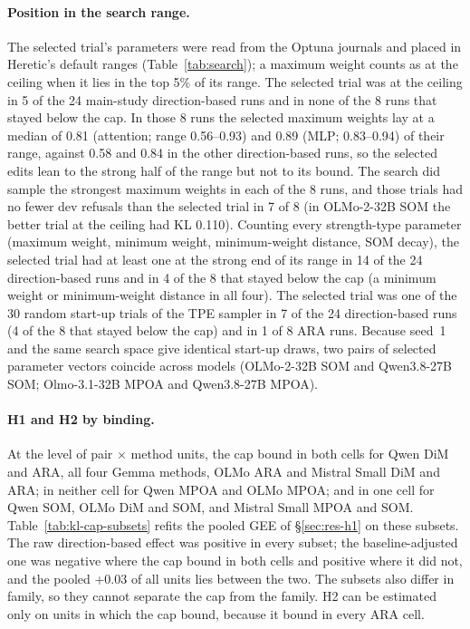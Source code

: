 \paragraph{Position in the search range.} The selected trial's parameters were
read from the Optuna journals and placed in Heretic's default ranges
(Table~\ref{tab:search}); a maximum weight counts as at the ceiling when it
lies in the top 5\% of its range. The selected trial was at the ceiling in 5
of the 24 main-study direction-based runs and in none of the 8 runs that
stayed below the cap. In those 8 runs the selected maximum weights lay at a
median of 0.81 (attention; range 0.56--0.93) and 0.89 (MLP; 0.83--0.94) of
their range, against 0.58 and 0.84 in the other direction-based runs, so the
selected edits lean to the strong half of the range but not to its bound. The
search did sample the strongest maximum weights in each of the 8 runs, and
those trials had no fewer dev refusals than the selected trial in 7 of 8 (in
OLMo-2-32B SOM the better trial at the ceiling had KL 0.110). Counting every
strength-type parameter (maximum weight, minimum weight, minimum-weight
distance, SOM decay), the selected trial had at least one at the strong end of
its range in 14 of the 24 direction-based runs and in 4 of the 8 that stayed
below the cap (a minimum weight or minimum-weight distance in all four). The selected
trial was one of the 30 random start-up trials of the TPE sampler in 7 of the
24 direction-based runs (4 of the 8 that stayed below the cap) and in 1 of 8
ARA runs. Because seed~1 and the same search space give identical start-up
draws, two pairs of selected parameter vectors coincide across models
(OLMo-2-32B SOM and Qwen3.8-27B SOM; Olmo-3.1-32B MPOA and Qwen3.8-27B MPOA).

\paragraph{H1 and H2 by binding.} At the level of pair $\times$ method units,
the cap bound in both cells for Qwen DiM and ARA, all four Gemma methods, OLMo
ARA and Mistral Small DiM and ARA; in neither cell for Qwen MPOA and OLMo
MPOA; and in one cell for Qwen SOM, OLMo DiM and SOM, and Mistral Small MPOA
and SOM. Table~\ref{tab:kl-cap-subsets} refits the pooled GEE of
\S\ref{sec:res-h1} on these subsets. The raw direction-based effect was
positive in every subset; the baseline-adjusted one was negative where the
cap bound in both cells and positive where it did not, and the pooled +0.03 of
all units lies between the two. The subsets also differ in family, so they
cannot separate the cap from the family. H2 can be estimated only on units in
which the cap bound, because it bound in every ARA cell.

